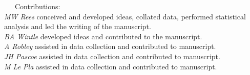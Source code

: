 \documentclass[11pt,a4paper,titlepage,twoside,openright]{style/unimelbthesis}
\begin{document}
\begin{frontmatter}
\begin{preface}
    ~~~Contributions:\\
    \hspace*{0.333em}\hspace*{0.333em}\hspace*{0.333em}\hspace*{0.333em}\hspace*{0.333em}\hspace*{0.333em}\hspace*{0.333em}\hspace*{0.333em}\emph{MW Rees} conceived and developed ideas, collated data, performed statistical analysis and led the writing of the manuscript.\\
    \hspace*{0.333em}\hspace*{0.333em}\hspace*{0.333em}\hspace*{0.333em}\hspace*{0.333em}\hspace*{0.333em}\hspace*{0.333em}\hspace*{0.333em}\emph{BA Wintle} developed ideas and contributed to the manuscript.\\
    \hspace*{0.333em}\hspace*{0.333em}\hspace*{0.333em}\hspace*{0.333em}\hspace*{0.333em}\hspace*{0.333em}\hspace*{0.333em}\hspace*{0.333em}\emph{A Robley} assisted in data collection and contributed to manuscript.\\
    \hspace*{0.333em}\hspace*{0.333em}\hspace*{0.333em}\hspace*{0.333em}\hspace*{0.333em}\hspace*{0.333em}\hspace*{0.333em}\hspace*{0.333em}\emph{JH Pascoe} assisted in data collection and contributed to manuscript.\\
    \hspace*{0.333em}\hspace*{0.333em}\hspace*{0.333em}\hspace*{0.333em}\hspace*{0.333em}\hspace*{0.333em}\hspace*{0.333em}\hspace*{0.333em}\emph{M Le Pla} assisted in data collection and contributed to manuscript.\\

\end{preface}
\end{frontmatter}
\end{document}
